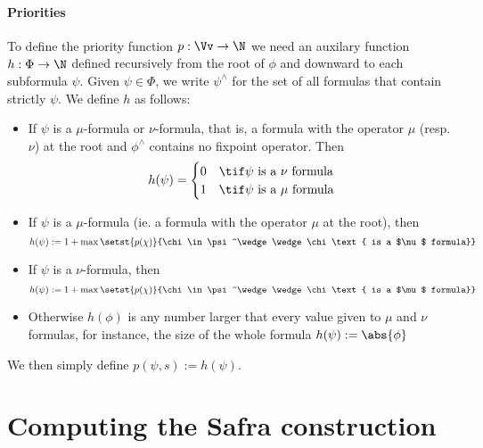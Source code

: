 \begin{definition}
    \paragraph{Priorities}
    To define the priority function $p: \Vv \to \N$
    we need an auxilary function $h: \Phi \to \N$ defined
    recursively from the root of $\phi$ and downward to each subformula $\psi$.
    Given $\psi \in \Phi$, we write $\psi^\wedge$ for the set of all formulas that contain strictly $\psi$.
    We define $h$ as follows:
    \begin{itemize}
        \item If $\psi$ is a $\mu$-formula or $\nu$-formula, that is, a formula with the
            operator $\mu$ (resp. $\nu$) at the root and $\phi^\wedge$ contains no fixpoint operator.
            Then \[
                h(\psi) = \begin{cases}
                    0 & \tif \psi \text{ is a $\nu$ formula} \\
                    1 & \tif \psi \text{ is a $\mu$ formula} \\
                \end{cases}
            \]
        \item If $\psi$ is a $\mu$-formula (ie. a formula with the operator $\mu$ at the root),
        then \[
            h(\psi) := 1 + \max \setst{p(\chi)}{\chi \in \psi^\wedge \wedge \chi \text{ is a $\nu$ formula}}
        \]
        \item If $\psi$ is a $\nu$-formula,
        then \[
            h(\psi) := 1 + \max \setst{p(\chi)}{\chi \in \psi^\wedge \wedge \chi \text{ is a $\mu$ formula}}
        \]
        \item Otherwise $h(\phi)$ is any number larger that every value given to $\mu$ and $\nu$
        formulas, for instance, the size of the whole formula $h(\psi) := \abs{\phi}$
    \end{itemize}
    We then simply define $p(\psi, s) := h(\psi)$.

\end{definition}














\clearpage
\appendix
\section{Computing the Safra construction}

